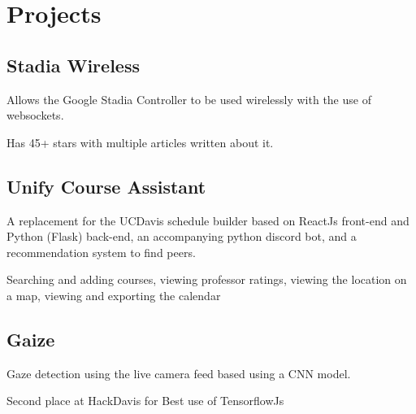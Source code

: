 \documentclass[]{deedy-resume-openfont}
\begin{document}
\begin{minipage}[t]{0.66\textwidth}
\section{Projects}

\subsection*{Stadia Wireless}
\vspace{\topsep}
\begin{tightemize}
\item Allows the Google Stadia Controller to be used wirelessly with the use of websockets.
\item Has 45+ stars with multiple articles written about it.
\end{tightemize}
\sectionsep

\subsection*{Unify Course Assistant}
\vspace{\topsep}
\begin{tightemize}
\item A replacement for the UCDavis schedule builder based on ReactJs front-end and Python (Flask) back-end, an accompanying python discord bot, and a recommendation system to find peers.
\item Searching and adding courses, viewing professor ratings, viewing the location on a map, viewing and exporting the calendar
\end{tightemize}
\sectionsep

\subsection*{Gaize}
\begin{tightemize}
\item Gaze detection using the live camera feed based using a CNN model.
\item Second place at HackDavis for Best use of TensorflowJs
\end{tightemize}
\sectionsep


\end{minipage}
\end{document}
